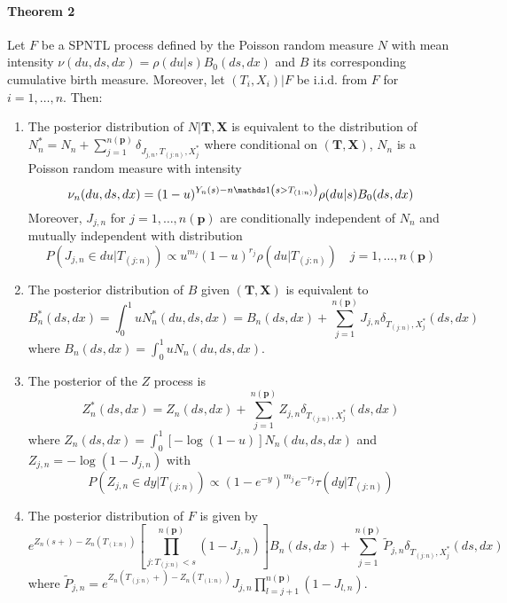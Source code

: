 \paragraph{Theorem 2} Let $F$ be a SPNTL process defined by the Poisson random measure $N$ with mean intensity $\nu(du, ds, dx) = \rho(du | s)B_0(ds, dx)$ and $B$ its corresponding cumulative birth measure. Moreover, let $(T_i, X_i)|F$ be i.i.d. from $F$ for $i = 1, \ldots, n$. Then:
\begin{enumerate}
	\item The posterior distribution of $N|\boldsymbol{T}, \boldsymbol{X}$ is equivalent to the distribution of $N_n^* = N_n + \sum_{j=1}^{n(\boldsymbol{p})} \delta_{J_{j,n}, T_{(j:n)}, X_j^*}$ where conditional on $(\boldsymbol{T}, \boldsymbol{X})$, $N_n$ is a Poisson random measure with intensity
	\begin{equation*}
	\nu_n(du,ds,dx) = (1-u)^{Y_n(s) - n\indicator\left(s > T_{(1:n)}\right)}\rho(du|s)B_0(ds, dx)
	\end{equation*}
	Moreover, $J_{j,n}$ for $j=1, \ldots, n(\boldsymbol{p})$ are conditionally independent of $N_n$ and mutually independent with distribution
	\begin{equation*}
	P\left(J_{j,n} \in du | T_{(j:n)}\right) \propto u^{m_j}(1-u)^{r_j}\rho\left(du|T_{(j:n)}\right) \quad j=1, \ldots, n(\boldsymbol{p})
	\end{equation*}
	\item The posterior distribution of $B$ given $(\boldsymbol{T}, \boldsymbol{X})$ is equivalent to 
	\begin{equation*}
	B_n^*(ds, dx) = \int_0^1 u N_n^*(du,ds,dx) = B_n(ds,dx) + \sum_{j=1}^{n(\boldsymbol{p})} J_{j,n} \delta_{T_{(j:n)}, X_j^*}(ds,dx)
	\end{equation*}
	where $B_n(ds,dx) = \int_0^1 u N_n(du,ds,dx)$.
	\item The posterior of the $Z$ process is 
	\begin{equation*}
	Z_n^*(ds, dx) = Z_n(ds,dx) + \sum_{j=1}^{n(\boldsymbol{p})} Z_{j,n} \delta_{T_{(j:n)}, X_j^*}(ds,dx)
	\end{equation*}
	where $Z_n(ds,dx) = \int_0^1 [-\log(1-u)] N_n(du,ds,dx)$ and $Z_{j,n} = -\log(1-J_{j,n})$ with
	\begin{equation*}
	P(Z_{j,n} \in dy|T_{(j:n)}) \propto  (1-e^{-y})^{m_j}e^{-r_j}\tau\left(dy|T_{(j:n)}\right)
	\end{equation*}
	\item The posterior distribution of $F$ is given by
	\begin{equation*}
	e^{Z_n(s+) - Z_n\left(T_{(1:n)}\right)}\left[\prod_{j: T_{(j:n)} < s}^{n(\boldsymbol{p})} (1 - J_{j,n})\right] B_n(ds, dx) + \sum_{j=1}^{n(\boldsymbol{p})} \tilde{P}_{j,n}\delta_{T_{(j:n)}, X_j^*}(ds,dx)
	\end{equation*}
	where $\tilde{P}_{j,n} = e^{Z_n(T_{(j:n)}+) - Z_n\left(T_{(1:n)}\right)} J_{j,n}\prod_{l=j+1}^{n(\boldsymbol{p})}(1- J_{l,n})$.
\end{enumerate}